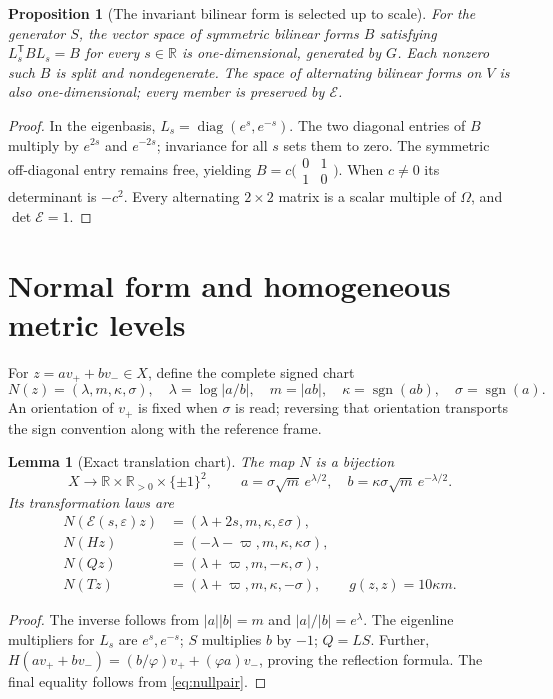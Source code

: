 \documentclass[10pt,letterpaper]{article}
\newtheorem{lemma}[theorem]{Lemma}
\newtheorem{proposition}[theorem]{Proposition}
\theoremstyle{definition}\newtheorem{definition}[theorem]{Definition}
\newcommand{\RR}{\mathbb R}
\newcommand{\eps}{\varepsilon}
\newcommand{\sgn}{\operatorname{sgn}}
\newcommand{\ph}{\varphi}
\newcommand{\varp}{\varpi}
\begin{document}
\begin{proposition}[The invariant bilinear form is selected up to scale]\label{prop:unique}
For the generator $S$, the vector space of symmetric bilinear forms $B$ satisfying $L_s^{\mathsf T}BL_s=B$ for every $s\in\RR$ is one-dimensional, generated by $G$. Each nonzero such $B$ is split and nondegenerate. The space of alternating bilinear forms on $V$ is also one-dimensional; every member is preserved by $\mathcal E$.
\end{proposition}
\begin{proof}
In the eigenbasis, $L_s=\operatorname{diag}(e^s,e^{-s})$. The two diagonal entries of $B$ multiply by $e^{2s}$ and $e^{-2s}$; invariance for all $s$ sets them to zero. The symmetric off-diagonal entry remains free, yielding $B=c\bigl(\begin{smallmatrix}0&1\\1&0\end{smallmatrix}\bigr)$. When $c\ne0$ its determinant is $-c^2$. Every alternating $2\times2$ matrix is a scalar multiple of $\Omega$, and $\det\mathcal E=1$.
\end{proof}

\section{Normal form and homogeneous metric levels}\label{sec:chart}
For $z=av_++bv_-\in X$, define the complete signed chart
\begin{equation}\label{eq:chart}
 N(z)=(\lambda,m,\kappa,\sigma),\quad
 \lambda=\log|a/b|,\quad m=|ab|,\quad
 \kappa=\sgn(ab),\quad \sigma=\sgn(a).
\end{equation}
An orientation of $v_+$ is fixed when $\sigma$ is read; reversing that orientation transports the sign convention along with the reference frame.

\begin{lemma}[Exact translation chart]\label{lem:chart}
The map $N$ is a bijection
\begin{equation}\label{eq:chartmap}
 X\longrightarrow \RR\times\RR_{>0}\times\{\pm1\}^2,\qquad
 a=\sigma\sqrt m\,e^{\lambda/2},\quad
 b=\kappa\sigma\sqrt m\,e^{-\lambda/2}.
\end{equation}
Its transformation laws are
\begin{align}\label{eq:chartlaws}
N(\mathcal E(s,\eps)z)&=(\lambda+2s,m,\kappa,\eps\sigma),\\
N(Hz)&=(-\lambda-\varp,m,\kappa,\kappa\sigma),\\
N(Qz)&=(\lambda+\varp,m,-\kappa,\sigma),\\
N(Tz)&=(\lambda+\varp,m,\kappa,-\sigma),\qquad
  g(z,z)=10\kappa m.\nonumber
\end{align}
\end{lemma}
\begin{proof}
The inverse follows from $|a||b|=m$ and $|a|/|b|=e^\lambda$. The eigenline multipliers for $L_s$ are $e^s,e^{-s}$; $S$ multiplies $b$ by $-1$; $Q=LS$. Further, $H(av_++bv_-)=(b/\ph)v_++(\ph a)v_-$, proving the reflection formula. The final equality follows from \eqref{eq:nullpair}.
\end{proof}
\end{document}

